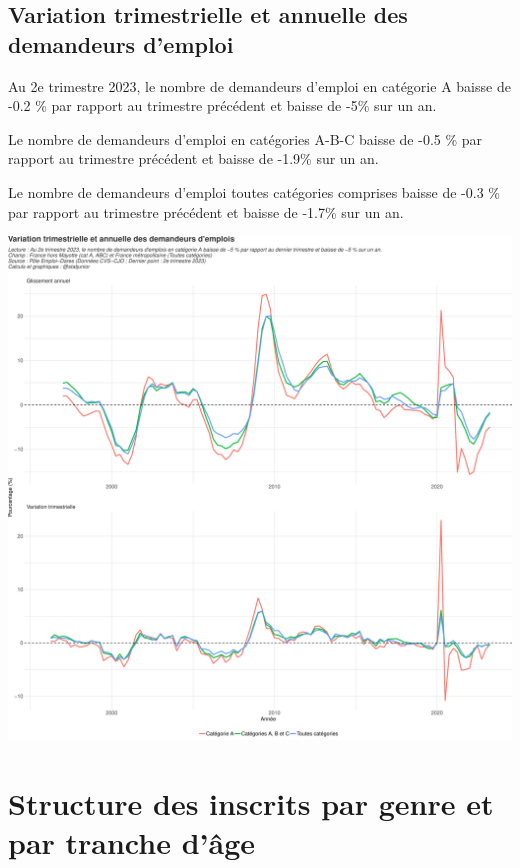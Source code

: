 \documentclass[
  paper=a4,
  ,captions=tableheading
]{scrartcl}
\begin{document}
\newpage

\hypertarget{variation-trimestrielle-et-annuelle-des-demandeurs-demploi}{%
\subsection{Variation trimestrielle et annuelle des demandeurs
d'emploi}\label{variation-trimestrielle-et-annuelle-des-demandeurs-demploi}}

Au 2e trimestre 2023, le nombre de demandeurs d'emploi en catégorie A
baisse de -0.2 \% par rapport au trimestre précédent et baisse de -5\%
sur un an.

Le nombre de demandeurs d'emploi en catégories A-B-C baisse de -0.5 \%
par rapport au trimestre précédent et baisse de -1.9\% sur un an.

Le nombre de demandeurs d'emploi toutes catégories comprises baisse de
-0.3 \% par rapport au trimestre précédent et baisse de -1.7\% sur un
an.

\includegraphics{rapport_pdf_demandeurs_emploi_pole_emploi_files/figure-latex/unnamed-chunk-5-1.pdf}

\hypertarget{structure-des-inscrits-par-genre-et-par-tranche-duxe2ge}{%
\section{Structure des inscrits par genre et par tranche
d'âge}\label{structure-des-inscrits-par-genre-et-par-tranche-duxe2ge}}
\end{document}
